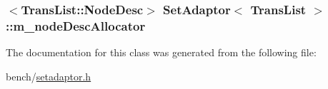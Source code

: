 \hypertarget{classSetAdaptor_3_01TransList_01_4_a0b3572181bde1cd713d76961bd3e6df9}{
\subsubsection[{m\-\_\-node\-Desc\-Allocator}]{$<${\bf Trans\-List\-::\-Node\-Desc}$>$ {\bf Set\-Adaptor}$<$ {\bf Trans\-List} $>$\-::m\-\_\-node\-Desc\-Allocator\hspace{0.3cm}{\ttfamily [private]}}}\label{classSetAdaptor_3_01TransList_01_4_a0b3572181bde1cd713d76961bd3e6df9}


The documentation for this class was generated from the following file\-:\begin{DoxyCompactItemize}
\item 
bench/\hyperlink{setadaptor_8h}{setadaptor.\-h}\end{DoxyCompactItemize}
